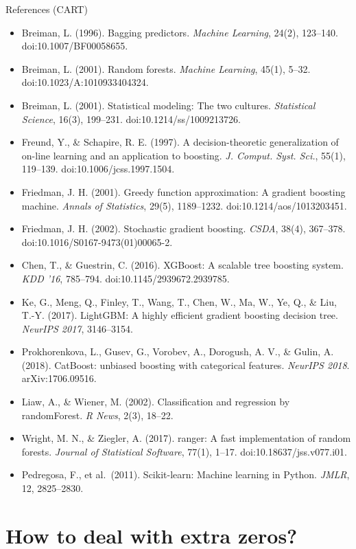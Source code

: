 \documentclass[10pt,ignorenonframetext,aspectratio=169]{beamer}
\begin{document}
\begin{frame}{References (CART)}
\begin{itemize}
    \item Breiman, L. (1996). Bagging predictors. \textit{Machine Learning}, 24(2), 123--140. doi:10.1007/BF00058655.
    \item Breiman, L. (2001). Random forests. \textit{Machine Learning}, 45(1), 5--32. doi:10.1023/A:1010933404324.
    \item Breiman, L. (2001). Statistical modeling: The two cultures. \textit{Statistical Science}, 16(3), 199--231. doi:10.1214/ss/1009213726.
    \item Freund, Y., \& Schapire, R. E. (1997). A decision-theoretic generalization of on-line learning and an application to boosting. \textit{J. Comput. Syst. Sci.}, 55(1), 119--139. doi:10.1006/jcss.1997.1504.
    \item Friedman, J. H. (2001). Greedy function approximation: A gradient boosting machine. \textit{Annals of Statistics}, 29(5), 1189--1232. doi:10.1214/aos/1013203451.
    \item Friedman, J. H. (2002). Stochastic gradient boosting. \textit{CSDA}, 38(4), 367--378. doi:10.1016/S0167-9473(01)00065-2.
    \item Chen, T., \& Guestrin, C. (2016). XGBoost: A scalable tree boosting system. \textit{KDD '16}, 785--794. doi:10.1145/2939672.2939785.
    \item Ke, G., Meng, Q., Finley, T., Wang, T., Chen, W., Ma, W., Ye, Q., \& Liu, T.-Y. (2017). LightGBM: A highly efficient gradient boosting decision tree. \textit{NeurIPS 2017}, 3146--3154.
    \item Prokhorenkova, L., Gusev, G., Vorobev, A., Dorogush, A. V., \& Gulin, A. (2018). CatBoost: unbiased boosting with categorical features. \textit{NeurIPS 2018}. arXiv:1706.09516.
    \item Liaw, A., \& Wiener, M. (2002). Classification and regression by randomForest. \textit{R News}, 2(3), 18--22.
    \item Wright, M. N., \& Ziegler, A. (2017). ranger: A fast implementation of random forests. \textit{Journal of Statistical Software}, 77(1), 1--17. doi:10.18637/jss.v077.i01.
    \item Pedregosa, F., et al.\ (2011). Scikit-learn: Machine learning in Python. \textit{JMLR}, 12, 2825--2830.
\end{itemize}
\end{frame}

\section{How to deal with extra zeros?}
\end{document}
